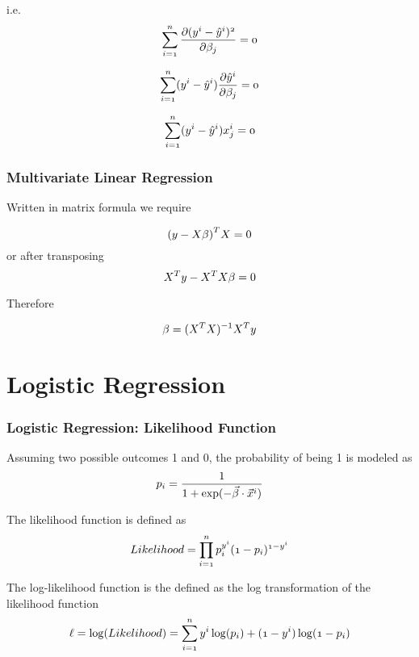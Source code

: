 \documentclass[notheorems, aspectratio=54]{beamer}
\begin{document}
\begin{frame}
i.e.
$$
\mathnormal{\sum\limits_{i=1}^{n}\frac{\partial (y^{i}-\hat{y}^{i})^2}{\partial \beta_j}=0}
$$

$$
\mathnormal{\sum\limits_{i=1}^{n}(y^{i}-\hat{y}^{i})\frac{\partial\hat{y}^{i}}{\partial \beta_j}=0}
$$

$$
\mathnormal{\sum\limits_{i=1}^{n}(y^{i}-\hat{y}^{i})x^{i}_{j}=0}
$$

\end{frame}
\begin{frame}

\frametitle{Multivariate Linear Regression}

Written in matrix formula we require

$$
\mathnormal{(y-X \beta)}^{T}\mathnormal{X}=0
$$
or after transposing
$$
\mathnormal{X^{T}}\mathnormal{y}-\mathnormal{X^T}\mathnormal{X}\beta=0
$$

Therefore 

$$
\beta=(\mathnormal{X^T}\mathnormal{X})^{-1}\mathnormal{X^{T}}\mathnormal{y}
$$

\end{frame}

\section{Logistic Regression}

\begin{frame}

\frametitle{Logistic Regression: Likelihood Function}
Assuming two possible outcomes 1 and 0, the probability of being 1 is modeled as $$\mathnormal{p_i}=\frac{1}{1+\mathnormal{\exp(-\vec{\beta}\cdot\vec{x}^i)}}$$

The likelihood function is defined as 
\begin{align*}
\mathnormal{Likelihood}&=\mathnormal{\prod_{i=1}^{n}p_{i}^{y^i}(1-p_{i})^{1-y^{i}}}\\
\end{align*}

The log-likelihood function is the defined as the log transformation of the likelihood function
\begin{align*}
\mathnormal{\ell}=\mathnormal{\log(Likelihood)}
&=\mathnormal{\sum_{i=1}^{n}y^i\log(p_i)+(1-y^i)\log(1-p_i)}\\
\end{align*}

\end{frame}
\end{document}
